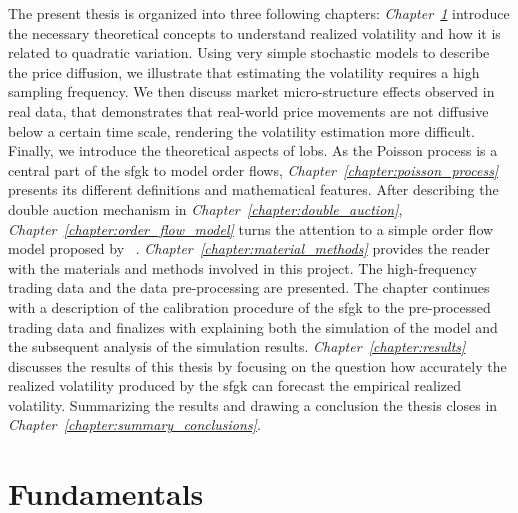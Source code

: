 \documentclass[11pt, a4paper]{thesis}  %
\begin{document}
\noindent The present thesis is organized into three following chapters: 
%
%
{\it Chapter~\ref{chapter:fundamentals}} introduce the necessary theoretical concepts to understand realized volatility and how it is related to  quadratic variation. Using very simple stochastic models to describe the price diffusion, we illustrate that estimating the volatility requires a high sampling frequency. We then discuss market micro-structure effects \cite{Hansen:2006:micro_structure, Phillips:2005:comment_micro_structure} observed in real data, that demonstrates that real-world price movements are not diffusive below a certain time scale, rendering the volatility estimation more difficult. Finally, we introduce the theoretical aspects of \acp{lob}. 
%
%
As the Poisson process is a central part of the \ac{sfgk} to model order flows, {\it Chapter~\ref{chapter:poisson_process}} presents its different definitions and mathematical features.
%
%
After describing the double auction mechanism in {\it Chapter~\ref{chapter:double_auction}}, 
%
%
{\it Chapter~\ref{chapter:order_flow_model}} turns the attention to a simple order flow model proposed by \citeauthor{Smith:2003:StatisticalModel}~\cite{Smith:2003:StatisticalModel}.
%
%
{\it Chapter~\ref{chapter:material_methods}} provides the reader with the materials and methods involved in this project. The high-frequency trading data and the data pre-processing are presented. The chapter continues with a description of the calibration procedure of the \ac{sfgk} to the pre-processed trading data and finalizes with explaining both the simulation of the model and the subsequent  analysis of the simulation results.
%
%
{\it Chapter~\ref{chapter:results}} discusses the results of this thesis by focusing on the question how accurately the realized volatility produced by the \ac{sfgk} can forecast the empirical realized volatility. 
%
%
Summarizing the results and drawing a conclusion the thesis closes in {\it Chapter~\ref{chapter:summary_conclusions}}.

%
%

\chapter{Fundamentals}
\label{chapter:fundamentals}
\end{document}
